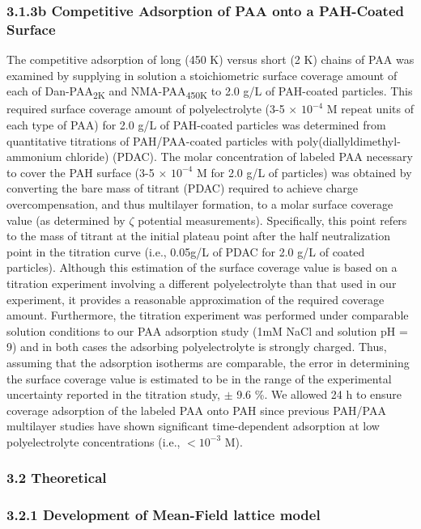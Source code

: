 \documentclass[journal=mamobx,manuscript=article]{achemso}
\begin{document}
\subsubsection{3.1.3b Competitive Adsorption of PAA onto a PAH-Coated Surface}

The competitive adsorption of long (450 K) versus short (2 K) chains of PAA was examined by supplying in solution a stoichiometric surface coverage amount of each of Dan-PAA\textsubscript{2K} and NMA-PAA\textsubscript{450K} to 2.0 g/L of PAH-coated particles.  This required surface coverage amount of polyelectrolyte (3-5 $\times$ $10^{-4}$ M repeat units of each type of PAA) for 2.0 g/L of PAH-coated particles was determined from quantitative titrations of PAH/PAA-coated particles with poly(diallyldimethyl-ammonium chloride) (PDAC).\cite{Burke2003}   The molar concentration of labeled PAA necessary to cover the PAH surface (3-5 $\times$ $10^{-4}$ M for 2.0 g/L of particles) was obtained by converting the bare mass of titrant (PDAC) required to achieve charge overcompensation, and thus multilayer formation, to a molar surface coverage value (as determined by $\zeta$ potential measurements).\cite{Burke2003}   Specifically, this point refers to the mass of titrant at the initial plateau point after the half neutralization point in the titration curve (i.e., 0.05g/L of PDAC for 2.0 g/L of coated particles).  Although this estimation of the surface coverage value is based on a titration experiment involving a different polyelectrolyte than that used in our experiment, it provides a reasonable approximation of the required coverage amount.  Furthermore, the titration experiment was performed under comparable solution conditions to our PAA adsorption study (1mM NaCl and solution pH = 9) and in both cases the adsorbing polyelectrolyte is strongly charged.  Thus, assuming that the adsorption isotherms are comparable, the error in determining the surface coverage value is estimated to be in the range of the experimental uncertainty reported in the titration study, $\pm$ 9.6 \%.  We allowed 24 h to ensure coverage adsorption of the labeled PAA onto PAH since previous PAH/PAA multilayer studies have shown significant time-dependent adsorption at low polyelectrolyte concentrations (i.e., $<10^{-3}$ M).\cite{Mermut2003}

\subsubsection{3.2 Theoretical}

\subsubsection{3.2.1 Development of Mean-Field lattice model}
\end{document}
